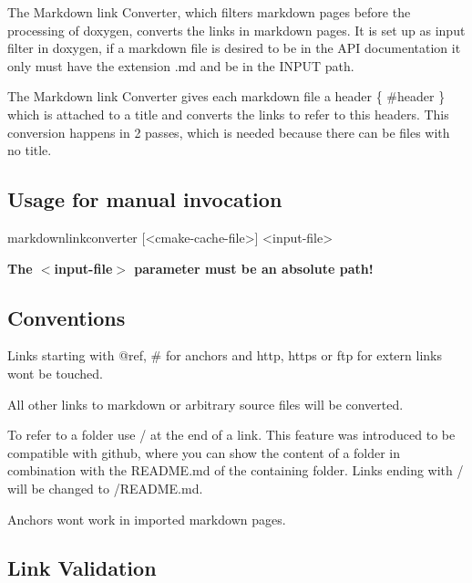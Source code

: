 The Markdown link Converter, which filters markdown pages before the processing of doxygen, converts the links in markdown pages. It is set up as input filter in doxygen, if a markdown file is desired to be in the A\+P\+I documentation it only must have the extension {\ttfamily .md} and be in the {\ttfamily I\+N\+P\+U\+T} path.

The Markdown link Converter gives each markdown file a header {\ttfamily \{ \#header \}} which is attached to a title and converts the links to refer to this headers. This conversion happens in 2 passes, which is needed because there can be files with no title.

\subsection*{Usage for manual invocation}

\begin{DoxyVerb}    markdownlinkconverter [<cmake-cache-file>] <input-file>
\end{DoxyVerb}


{\bfseries The $<$input-\/file$>$ parameter must be an absolute path!}

\subsection*{Conventions}


\begin{DoxyItemize}
\item Links starting with {\ttfamily @ref}, {\ttfamily \#} for anchors and {\ttfamily http}, {\ttfamily https} or {\ttfamily ftp} for extern links wont be touched.
\item All other links to markdown or arbitrary source files will be converted.
\item To refer to a folder use {\ttfamily /} at the end of a link. This feature was introduced to be compatible with github, where you can show the content of a folder in combination with the R\+E\+A\+D\+M\+E.\+md of the containing folder. Links ending with {\ttfamily /} will be changed to {\ttfamily /\+R\+E\+A\+D\+M\+E.md}.
\item Anchors wont work in imported markdown pages.
\end{DoxyItemize}

\subsection*{Link Validation}

